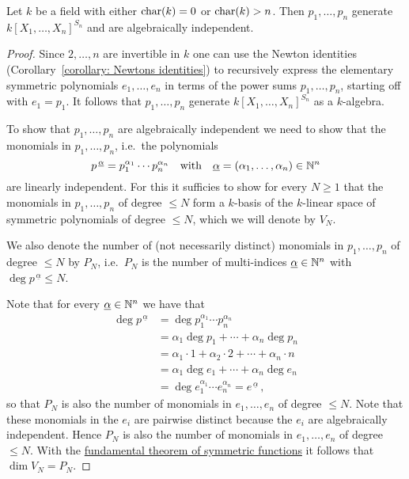 \begin{theorem}
  Let $k$ be a field with either $\operatorname{char}(k) = 0$ or $\operatorname{char}(k) > n$.
  Then $p_1, \dotsc, p_n$ generate $k[X_1, \dotsc, X_n]^{S_n}$ and are algebraically independent.
\end{theorem}
\begin{proof}
  Since $2, \dotsc, n$ are invertible in $k$ one can use the Newton identities (Corollary~\ref{corollary: Newtons identities}) to recursively express the elementary symmetric polynomials $e_1, \dotsc, e_n$ in terms of the power sums $p_1, \dotsc, p_n$, starting off with $e_1 = p_1$.
  It follows that $p_1, \dotsc, p_n$ generate $k[X_1, \dotsc, X_n]^{S_n}$ as a $k$-algebra.
  
  To show that $p_1, \dotsc, p_n$ are algebraically independent we need to show that the monomials in $p_1, \dotsc, p_n$, i.e.\ the polynomials
  \[
      p^{\,\underline{\alpha}}
    = p_1^{\alpha_1} \dotsm p_n^{\alpha_n}
    \quad\text{with}\quad
        \underline{\alpha}
    =   (\alpha_1, \dotsc, \alpha_n)
    \in \mathbb{N}^n
  \]
  are linearly independent.
  For this it sufficies to show for every $N \geq 1$ that the monomials in $p_1, \dotsc, p_n$ of degree $\leq N$ form a $k$-basis of the $k$-linear space of symmetric polynomials of degree $\leq N$, which we will denote by $V_N$.
  
  We also denote the number of (not necessarily distinct) monomials in $p_1, \dotsc, p_n$ of degree $\leq N$ by $P_N$, i.e.\ $P_N$ is the number of multi-indices $\underline{\alpha} \in \mathbb{N}^n$ with $\deg p^{\,\underline{\alpha}} \leq N$.
  
  Note that for every $\underline{\alpha} \in \mathbb{N}^n$ we have that
  \begin{align*}
        \deg p^{\,\underline{\alpha}}
    &=  \deg
        p_1^{\alpha_1}
        \dotsm 
        p_n^{\alpha_n} \\
    &=    \alpha_1 \deg p_1
        + \dotsb 
        + \alpha_n \deg p_n \\
    &=    \alpha_1 \cdot 1
        + \alpha_2 \cdot 2
        + \dotsb
        + \alpha_n \cdot n  \\
    &=    \alpha_1 \deg e_1
        + \dotsb 
        + \alpha_n \deg e_n \\
    &=  \deg
        e_1^{\alpha_1}
        \dotsm 
        e_n^{\alpha_n}
     =  e^{\,\underline{\alpha}} \,,
  \end{align*}
  so that $P_N$ is also the number of monomials in $e_1, \dotsc, e_n$ of degree $\leq N$.
  Note that these monomials in the $e_i$ are pairwise distinct because the $e_i$ are algebraically independent.
  Hence $P_N$ is also the number of monomials in $e_1, \dotsc, e_n$ of degree $\leq N$.
  With the \hyperref[theorem: fundamental theorem of symmetric functions]{fundamental theorem of symmetric functions} it follows that $\dim V_N = P_N$.
  

\end{proof}
